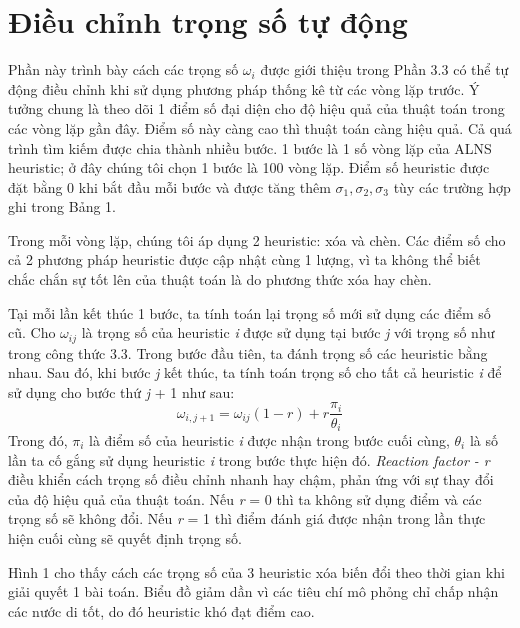 \section{Điều chỉnh trọng số tự động}
Phần này trình bày cách các trọng số $\omega_i$ được giới thiệu trong Phần 3.3 có thể tự động điều chỉnh khi sử dụng phương pháp thống kê từ các vòng lặp trước. Ý tưởng chung là theo dõi 1 điểm số đại diện cho độ hiệu quả của thuật toán trong các vòng lặp gần đây. Điểm số này càng cao thì thuật toán càng hiệu quả. Cả quá trình tìm kiếm được chia thành nhiều bước. 1 bước là 1 số vòng lặp của ALNS heuristic; ở đây chúng tôi chọn 1 bước là 100 vòng lặp. Điểm số heuristic được đặt bằng 0 khi bắt đầu mỗi bước và được tăng thêm $\sigma_1, \sigma_2, \sigma_3$ tùy các trường hợp ghi trong Bảng 1.


Trong mỗi vòng lặp, chúng tôi áp dụng 2 heuristic: xóa và chèn. Các điểm số cho cả 2 phương pháp heuristic được cập nhật cùng 1 lượng, vì ta không thể biết chắc chắn sự tốt lên của thuật toán là do phương thức xóa hay chèn.

Tại mỗi lần kết thúc 1 bước, ta tính toán lại trọng số mới sử dụng các điểm số cũ. Cho $\omega_{ij}$ là trọng số của heuristic \textit{i} được sử dụng tại bước \textit{j} với trọng số như trong công thức 3.3. Trong bước đầu tiên, ta đánh trọng số các heuristic bằng nhau. Sau đó, khi bước \textit{j} kết thúc, ta tính toán trọng số cho tất cả heuristic \textit{i} để sử dụng cho bước thứ \textit{j} + 1 như sau:
\begin{equation}
    \omega_{i, j+1} = \omega_{ij}(1-r)+r\frac{\pi_i}{\theta_i}
\end{equation}
Trong đó, $\pi_i$ là điểm số của heuristic \textit{i} được nhận trong bước cuối cùng, $\theta_i$ là số lần ta cố gắng sử dụng heuristic \textit{i} trong bước thực hiện đó. \textit{Reaction factor - r} điều khiển cách trọng số điều chỉnh nhanh hay chậm, phản ứng với sự thay đổi của độ hiệu quả của thuật toán. Nếu \textit{r} = 0 thì ta không sử dụng điểm và các trọng số sẽ không đổi. Nếu \textit{r} = 1 thì điểm đánh giá được nhận trong lần thực hiện cuối cùng sẽ quyết định trọng số.


Hình 1 cho thấy cách các trọng số của 3 heuristic xóa biến đổi theo thời gian khi giải quyết 1 bài toán. Biểu đồ giảm dần vì các tiêu chí mô phỏng chỉ chấp nhận các nước di tốt, do đó heuristic khó đạt điểm cao.

